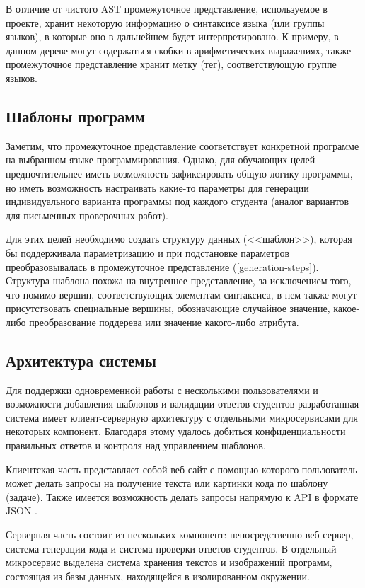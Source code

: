 В отличие от чистого AST промежуточное представление, используемое в проекте, хранит
некоторую информацию о синтаксисе языка (или группы языков), в которые оно в дальнейшем
будет интерпретировано. К примеру, в данном дереве могут содержаться скобки в арифметических выражениях,
также промежуточное представление хранит метку (тег), соответствующую группе языков.

\subsection{Шаблоны программ}
\label{templates}

Заметим, что промежуточное представление соответствует конкретной программе на
выбранном языке программирования. Однако, для обучающих целей предпочтительнее
иметь возможность зафиксировать общую логику программы, но иметь возможность
настраивать какие-то параметры для генерации индивидуального варианта программы
под каждого студента (аналог вариантов для письменных проверочных работ).

Для этих целей необходимо создать структуру данных (<<шаблон>>), которая бы поддерживала
параметризацию и при подстановке параметров преобразовывалась в промежуточное
представление (\ref{generation-steps}).
Структура шаблона похожа на внутреннее представление, за исключением того, что
помимо вершин, соответствующих элементам синтаксиса, в нем также могут присутствовать
специальные вершины, обозначающие случайное значение, какое-либо преобразование
поддерева или значение какого-либо атрибута.

\subsection{Архитектура системы}
Для поддержки одновременной работы с несколькими пользователями и возможности
добавления шаблонов и валидации ответов студентов разработанная система имеет
клиент-серверную архитектуру с отдельными микросервисами для
некоторых компонент. Благодаря этому удалось добиться конфиденциальности правильных
ответов и контроля над управлением шаблонов.

Клиентская часть представляет собой веб-сайт с помощью которого пользователь может делать
запросы на получение текста или картинки кода по шаблону (задаче). Также имеется возможность
делать запросы напрямую к API в формате JSON \cite{json}.

Серверная часть состоит из нескольких компонент: непосредственно веб-сервер, система генерации
кода и система проверки ответов студентов. В отдельный микросервис выделена система хранения
текстов и изображений программ, состоящая из базы данных, находящейся в изолированном окружении.

